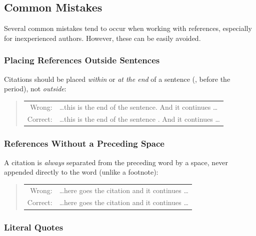 \subsection{Common Mistakes}

Several common mistakes tend to occur when working with references, especially
for inexperienced authors. However, these can be easily avoided.

\subsubsection{Placing References Outside Sentences}

Citations should be placed \emph{within} or \emph{at the end} of a sentence (\ie, before the
period), not \emph{outside}:
%
\begin{quote}
	\begin{tabular}{rl}
		\textrm{Wrong:}  & \ldots this is the end of the sentence.
		\cite{Oetiker2021} And it continues \ldots \\
		\textrm{Correct:} & \ldots this is the end of the sentence
		\cite{Oetiker2021}. And it continues \ldots
	\end{tabular}
\end{quote}

\subsubsection{References Without a Preceding Space}

A citation is \emph{always} separated from the preceding word by a space, never
appended directly to the word (unlike a footnote):
%
\begin{quote}
	\begin{tabular}{rl}
		\textrm{Wrong:}  & \ldots here goes the
		citation\cite{Oetiker2021} and it continues \ldots  \\
		\textrm{Correct:} & \ldots here goes the citation
		\cite{Oetiker2021} and it continues \ldots
	\end{tabular}
\end{quote}

\subsubsection{Literal Quotes}


